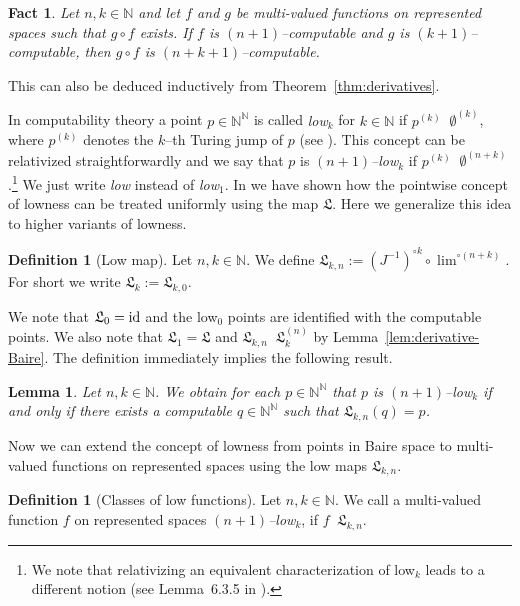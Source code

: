 \documentclass[a4paper]{amsart}
\def\IN{{\mathbb{N}}}
\def\Low{\mathfrak{L}}
\def\id{{\rm id}}
\def\Baire{{\IN^\IN}}
\def\leqT{\mathop{\leq_{\mathrm{T}}}}
\def\leqSW{\mathop{\leq_{\mathrm{sW}}}}
\def\equivSW{\mathop{\equiv_{\mathrm{sW}}}}
\newtheorem{lemma}[theorem]{Lemma}
\newtheorem{fact}[theorem]{Fact}
\theoremstyle{definition}
\newtheorem{definition}[theorem]{Definition}
\begin{document}
\begin{fact}
\label{fact:composition-limit}
Let $n,k\in\IN$ and let $f$ and $g$ be multi-valued functions on represented spaces such that $g\circ f$ exists.
If $f$ is $(n+1)$--computable and $g$ is $(k+1)$--computable, then $g\circ f$ is $(n+k+1)$--computable.
\end{fact}

This can also be deduced inductively from Theorem~\ref{thm:derivatives}.

In computability theory a point $p\in\Baire$ is called {\em low$_k$} for $k\in\IN$
if $p^{(k)}\leqT\emptyset^{(k)}$, where $p^{(k)}$ denotes the $k$--th Turing jump of $p$ (see \cite{Soa87}).
This concept can be relativized straightforwardly and we say that $p$ is {\em $(n+1)$--low$_k$} if
$p^{(k)}\leqT\emptyset^{(n+k)}$.\footnote{We note that relativizing an equivalent characterization
of low$_k$ leads to a different notion (see Lemma~6.3.5 in \cite{Nie09}).}
We just write {\em low} instead of {\em low$_1$}.
In \cite{BBP} we have shown how the pointwise concept of lowness can be treated uniformly
using the map $\Low$. Here we generalize this idea to higher variants of lowness.

\begin{definition}[Low map]
Let $n,k\in\IN$. We define $\Low_{k,n}:=(J^{-1})^{\circ k}\circ\lim^{\circ (n+k)}$. 
For short we write $\Low_k:=\Low_{k,0}$.
\end{definition}

We note that $\Low_0=\id$ and the low$_0$ points are identified with the computable points.
We also note that $\Low_1=\Low$ and $\Low_{k,n}\equivSW\Low_k^{(n)}$ by Lemma~\ref{lem:derivative-Baire}.
The definition immediately implies the following result.

\begin{lemma}
\label{lem:low-points}
Let $n,k\in\IN$.
We obtain for each $p\in\Baire$ that $p$ is $(n+1)$--low$_k$ if and only if there exists a computable $q\in\Baire$
such that $\Low_{k,n}(q)=p$.
\end{lemma}

Now we can extend the concept of lowness from points in Baire space to multi-valued functions on represented
spaces using the low maps $\Low_{k,n}$.

\begin{definition}[Classes of low functions]
Let $n,k\in\IN$. We call a multi-valued function $f$ on represented spaces 
{\em $(n+1)$--low$_k$}, if $f\leqSW\Low_{k,n}$. 
\end{definition}
\end{document}
